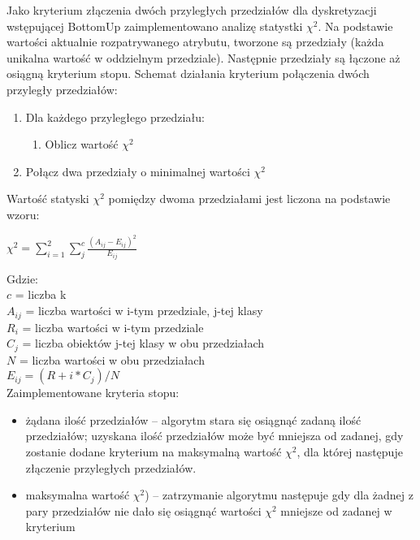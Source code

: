 Jako kryterium złączenia dwóch przyległych przedziałów dla dyskretyzacji wstępującej BottomUp zaimplementowano analizę statystki $\chi^2$. Na podstawie wartości aktualnie rozpatrywanego atrybutu, tworzone są przedziały (każda unikalna wartość w oddzielnym przedziale). Następnie przedziały są łączone aż osiągną kryterium stopu. Schemat działania kryterium połączenia dwóch przyległy przedziałów:
\begin{enumerate}
	\item{Dla każdego przyległego przedziału:}
	\begin{enumerate}
		\item{Oblicz wartość $\chi^2$}
	\end{enumerate}
	\item{Połącz dwa przedziały o minimalnej wartości $\chi^2$}
\end{enumerate}
Wartość statyski $\chi^2$ pomiędzy dwoma przedziałami jest liczona na podstawie wzoru: \\

\begin{center}
$\chi^2 = \sum_{i=1}^{2}\sum_{j}^{c}\frac{(A_{ij}-E_{ij})^2}{E_{ij}}$
\end{center}
Gdzie:
\\$c$ = liczba k
\\$A_{ij}$ = liczba wartości w i-tym przedziale, j-tej klasy
\\$R_{i}$ = liczba wartości w i-tym przedziale
\\$C_{j}$ = liczba obiektów j-tej klasy w obu przedziałach
\\$N$ = liczba wartości w obu przedziałach
\\$E_{ij} = (R+{i}*C_{j})/N$
\\Zaimplementowane kryteria stopu:
\begin{itemize}
	\item{żądana ilość przedziałów -- algorytm stara się osiągnąć zadaną ilość przedziałów; uzyskana ilość przedziałów może być mniejsza od zadanej, gdy zostanie dodane kryterium  na maksymalną wartość $\chi^2$, dla której następuje złączenie przyległych przedziałów. }
	\item{maksymalna wartość $\chi^2$) -- zatrzymanie algorytmu następuje gdy dla żadnej z pary przedziałów nie dało się osiągnąć wartości $\chi^2$ mniejsze od zadanej w kryterium}
\end{itemize}
